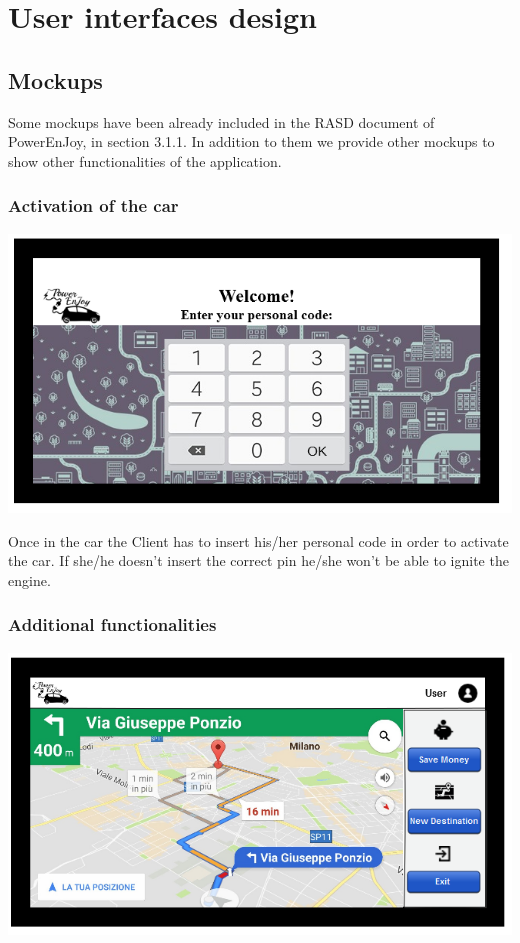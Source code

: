 \chapter{User interfaces design}
\section{Mockups}
Some mockups have been already included in the RASD document of PowerEnJoy, in section 3.1.1.
In addition to them we provide other mockups to show other functionalities of the application.

\subsection{Activation of the car}

\includegraphics[width=\textwidth, keepaspectratio]{../images/mockups/pin.png}

Once in the car the Client has to insert his/her personal code in order to activate the car.
If she/he doesn’t insert the correct pin he/she won’t be able to ignite the engine.
\subsection{Additional functionalities}

\includegraphics[width=\textwidth, keepaspectratio]{../images/mockups/ride.png}

